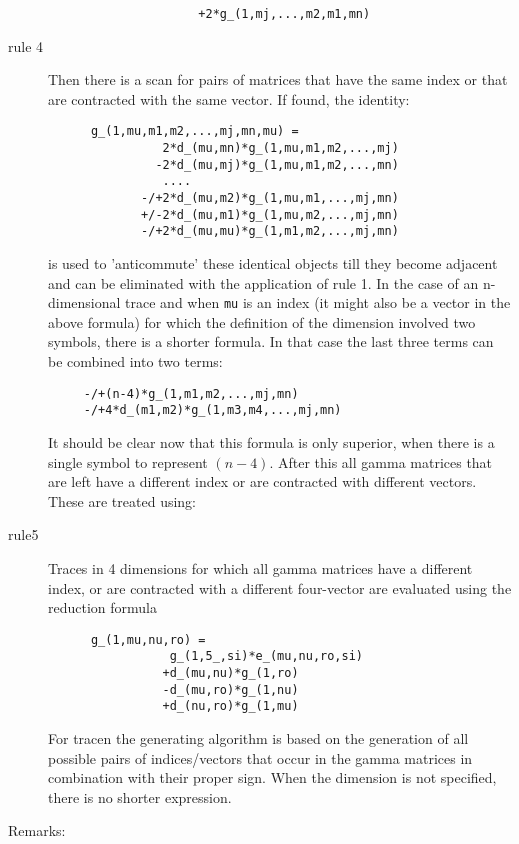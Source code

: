 \begin{description}
\begin{verbatim}
                     +2*g_(1,mj,...,m2,m1,mn)
\end{verbatim}
\item [rule 4]
  Then there is a scan for pairs of matrices that have the 
same index or that are contracted with the same vector. If found, the 
identity:
\begin{verbatim}
      g_(1,mu,m1,m2,...,mj,mn,mu) =
                2*d_(mu,mn)*g_(1,mu,m1,m2,...,mj)
               -2*d_(mu,mj)*g_(1,mu,m1,m2,...,mn)
                ....
             -/+2*d_(mu,m2)*g_(1,mu,m1,...,mj,mn)
             +/-2*d_(mu,m1)*g_(1,mu,m2,...,mj,mn)
             -/+2*d_(mu,mu)*g_(1,m1,m2,...,mj,mn)
\end{verbatim}
\noindent is used to 'anticommute' these identical 
objects till they become adjacent and can be eliminated with the 
application of rule 1. In the case of an n-dimensional trace and when 
\verb:mu: is an index (it might also be a vector in the above formula) for 
which the definition of the dimension involved two symbols, there is a 
shorter formula. In that case the last three terms can be combined into two 
terms:
\begin{verbatim}
     -/+(n-4)*g_(1,m1,m2,...,mj,mn)
     -/+4*d_(m1,m2)*g_(1,m3,m4,...,mj,mn)
\end{verbatim}
\noindent It should be clear now that this formula is only superior, when 
there is a single symbol to represent $(n-4)$. After this all gamma 
matrices that are left have a different index or are contracted with 
different vectors. These are treated using:
\item [rule5]
  Traces in 4 dimensions for which all gamma matrices have 
a different index, or are contracted with a different four-vector are 
evaluated using the reduction formula
\begin{verbatim}
      g_(1,mu,nu,ro) =
                 g_(1,5_,si)*e_(mu,nu,ro,si)
                +d_(mu,nu)*g_(1,ro)
                -d_(mu,ro)*g_(1,nu)
                +d_(nu,ro)*g_(1,mu)
\end{verbatim}
For tracen the generating algorithm is based on the generation of all 
possible pairs of indices/vectors that occur in the gamma matrices in 
combination with their proper sign. When the dimension is not specified, 
there is no shorter expression.
\end{description}

\noindent Remarks:

